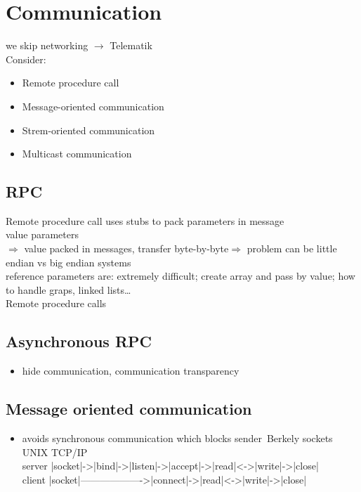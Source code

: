 \documentclass[ngerman,a4paper]{report}
\begin{document}
\section{Communication}
we skip networking $\rightarrow$ Telematik\\

Consider:\\
\begin{itemize}
	\item Remote procedure call
	\item Message-oriented communication
	\item Strem-oriented communication
	\item Multicast communication
\end{itemize}

\subsection{RPC}
Remote procedure call uses stubs to pack parameters in message\\
value parameters\\
$\Rightarrow$ value packed in messages, transfer byte-by-byte$\Rightarrow$ problem can be little endian vs big endian systems\\
reference parameters are: extremely difficult; create array and pass by value; how to handle graps, linked lists\ldots\\






Remote procedure calls\\
\subsection{Asynchronous RPC}

\begin{itemize}
	\item hide communication, communication transparency
\end{itemize}

\subsection{Message oriented communication\\}
\begin{itemize}
	\item avoids synchronous communication which blocks sender\
	Berkely sockets UNIX TCP/IP\\
	server |socket|->|bind|->|listen|->|accept|->|read|<->|write|->|close|\\
	client |socket|------------------->|connect|->|read|<->|write|->|close|\\

\end{itemize}
\end{document}
